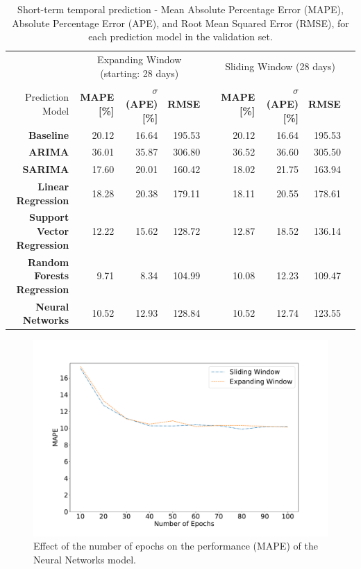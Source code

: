 \begin{table}
\centering
\begin{tabular}{@{}rrrrcrrrr@{}}
\toprule
& \multicolumn{3}{c}{Expanding Window (starting: 28 days)} & \phantom{abc} & \multicolumn{3}{c}{Sliding Window (28 days)} \\
\cmidrule{2-4} \cmidrule{6-8}
 {Prediction Model} & \textbf{MAPE [\%]} & \textbf{$\sigma$(APE) [\%]} & \textbf{RMSE} && \textbf{MAPE [\%]} & \textbf{$\sigma$(APE) [\%]} & \textbf{RMSE} \\ 
 \midrule
  \textbf{Baseline}                     & 20.12 & 16.64 & 195.53 && 20.12 & 16.64 & 195.53 \\
  \textbf{ARIMA}                        & 36.01 & 35.87 & 306.80 && 36.52 & 36.60 & 305.50 \\
  \textbf{SARIMA}                       & 17.60 & 20.01 & 160.42 && 18.02 & 21.75 & 163.94 \\
  \textbf{Linear Regression}            & 18.28 & 20.38 & 179.11 && 18.11 & 20.55 & 178.61 \\
  \textbf{Support Vector Regression}    & 12.22 & 15.62 & 128.72 && 12.87 & 18.52 & 136.14 \\  
  \textbf{Random Forests Regression}    & 9.71  & 8.34  & 104.99 && 10.08 & 12.23 & 109.47 \\
  \textbf{Neural Networks}              & 10.52 & 12.93 & 128.84 && 10.52 & 12.74 & 123.55 \\
\bottomrule
\end{tabular}
\caption{Short-term temporal prediction - Mean Absolute Percentage Error (MAPE), Absolute Percentage Error (APE), and Root Mean Squared Error (RMSE), for each prediction model in the validation set.}
\label{tab:8_4_results-dynamic-models}
\end{table}

\begin{figure}
    \begin{center}
            \includegraphics[width=0.65\columnwidth]{figures/temporal_analyses/MAPEEpochs.pdf}
        \caption{Effect of the number of epochs on the performance (MAPE) of the Neural Networks model.}
            \label{fig:8_4_epochs-mape}
    \end{center}
\end{figure}

